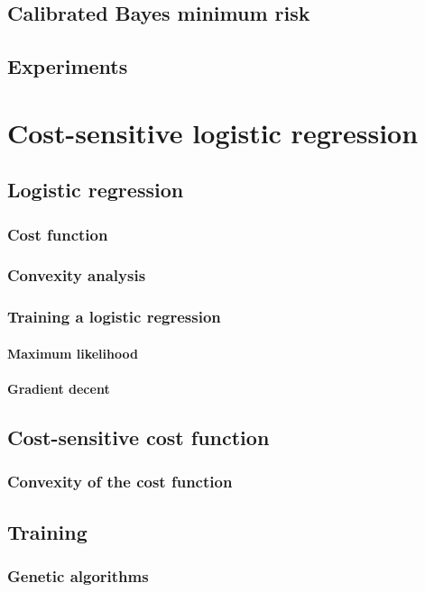 \documentclass[twoside,openright,titlepage,numbers=noenddot,headinclude,%
               footinclude=true,cleardoublepage=empty,abstractoff,BCOR=5mm,%
               paper=a4,fontsize=11pt,ngerman,american,doublespace]{scrreprt}
\numberwithin{theorem}{chapter}
\numberwithin{definition}{chapter}
\numberwithin{algorithm}{chapter}
\numberwithin{figure}{chapter}
\numberwithin{table}{chapter}
\numberwithin{equation}{chapter}
\begin{document}
		\section{Calibrated Bayes minimum risk}
		\section{Experiments}
		
	\chapter{Cost-sensitive logistic regression}
		\section{Logistic regression}
			\subsection{Cost function}
				\subsection{Convexity analysis}
			\subsection{Training a logistic regression}
				\subsubsection{Maximum likelihood}
				\subsubsection{Gradient decent}
		\section{Cost-sensitive cost function}
			\subsection{Convexity of the cost function}
		\section{Training}	
			\subsection{Genetic algorithms}
\end{document}
